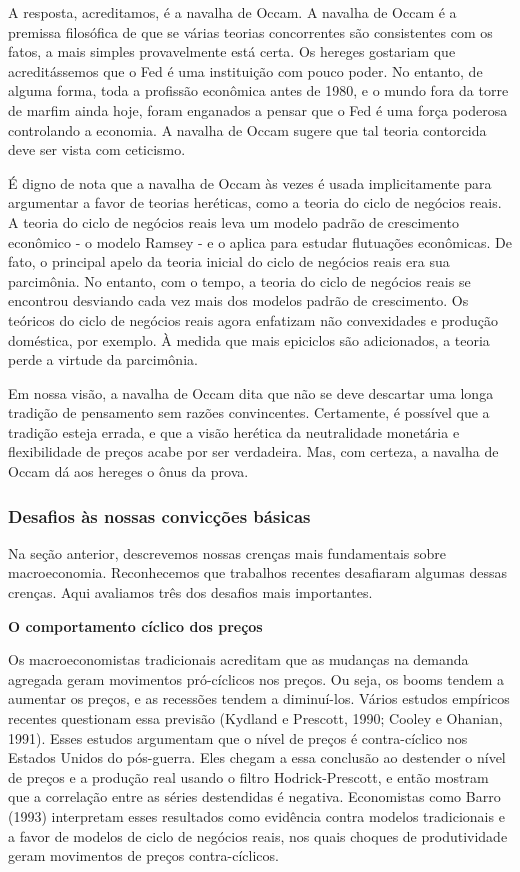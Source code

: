 \documentclass[12pt]{article}
\begin{document}
A resposta, acreditamos, é a navalha de Occam. A navalha de Occam é a premissa filosófica de que se várias teorias concorrentes são consistentes com os fatos, a mais simples provavelmente está certa. Os hereges gostariam que acreditássemos que o Fed é uma instituição com pouco poder. No entanto, de alguma forma, toda a profissão econômica antes de 1980, e o mundo fora da torre de marfim ainda hoje, foram enganados a pensar que o Fed é uma força poderosa controlando a economia. A navalha de Occam sugere que tal teoria contorcida deve ser vista com ceticismo.

É digno de nota que a navalha de Occam às vezes é usada implicitamente para argumentar a favor de teorias heréticas, como a teoria do ciclo de negócios reais. A teoria do ciclo de negócios reais leva um modelo padrão de crescimento econômico - o modelo Ramsey - e o aplica para estudar flutuações econômicas. De fato, o principal apelo da teoria inicial do ciclo de negócios reais era sua parcimônia. No entanto, com o tempo, a teoria do ciclo de negócios reais se encontrou desviando cada vez mais dos modelos padrão de crescimento. Os teóricos do ciclo de negócios reais agora enfatizam não convexidades e produção doméstica, por exemplo. À medida que mais epiciclos são adicionados, a teoria perde a virtude da parcimônia.

Em nossa visão, a navalha de Occam dita que não se deve descartar uma longa tradição de pensamento sem razões convincentes. Certamente, é possível que a tradição esteja errada, e que a visão herética da neutralidade monetária e flexibilidade de preços acabe por ser verdadeira. Mas, com certeza, a navalha de Occam dá aos hereges o ônus da prova.

\subsubsection{\textbf{Desafios às nossas convicções básicas}}

Na seção anterior, descrevemos nossas crenças mais fundamentais sobre macroeconomia. Reconhecemos que trabalhos recentes desafiaram algumas dessas crenças. Aqui avaliamos três dos desafios mais importantes.

\textbf{O comportamento cíclico dos preços}

Os macroeconomistas tradicionais acreditam que as mudanças na demanda agregada geram movimentos pró-cíclicos nos preços. Ou seja, os booms tendem a aumentar os preços, e as recessões tendem a diminuí-los. Vários estudos empíricos recentes questionam essa previsão (Kydland e Prescott, 1990; Cooley e Ohanian, 1991). Esses estudos argumentam que o nível de preços é contra-cíclico nos Estados Unidos do pós-guerra. Eles chegam a essa conclusão ao destender o nível de preços e a produção real usando o filtro Hodrick-Prescott, e então mostram que a correlação entre as séries destendidas é negativa. Economistas como Barro (1993) interpretam esses resultados como evidência contra modelos tradicionais e a favor de modelos de ciclo de negócios reais, nos quais choques de produtividade geram movimentos de preços contra-cíclicos.
\end{document}
